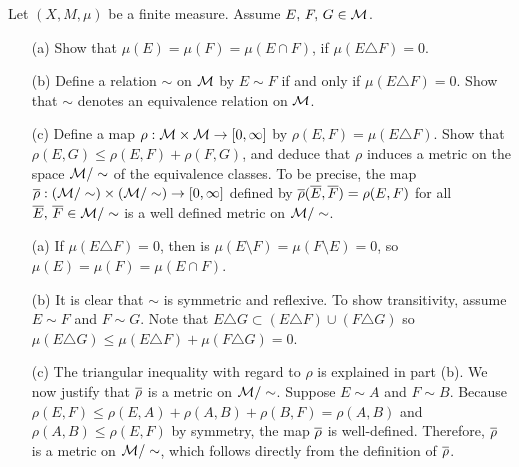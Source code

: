 \begin{prob}[Exercise 1.12]
    Let $(X, M, \mu)$ be a finite measure.
    Assume $E,\,F,\,G\in{\mathcal{M}}$.
    \begin{enumerate}
        \item[(a)]
        {
            Show that $\mu(E)=\mu(F)=\mu(E\cap F)$, if $\mu(E\triangle F)=0$.
        }
        \item[(b)]
        {
            Define a relation $\sim$ on ${\mathcal{M}}$ by $E\sim F$ if and only if $\mu(E\triangle F)=0$.
            Show that $\sim$ denotes an equivalence relation on ${\mathcal{M}}$.
        }
        \item[(c)]
        {
            Define a map $\rho: {\mathcal{M}}\times{\mathcal{M}}\rightarrow[0, \infty]$ by $\rho(E, F)=\mu(E\triangle F)$.
            Show that $\rho(E, G)\leq\rho(E, F)+\rho(F, G)$, and deduce that $\rho$ induces a metric on the space ${\mathcal{M}}/\sim$ of the equivalence classes.
            To be precise, the map $\overline{\rho}: ({\mathcal{M}}/\sim)\times({\mathcal{M}}/\sim)\rightarrow[0,\infty]$ defined by $\overline{\rho}(\overline{E}, \overline{F})=\rho(E, F)$ for all $\overline{E},\,\overline{F}\in{\mathcal{M}}/\sim$ is a well defined metric on ${\mathcal{M}}/\sim$.
        }
    \end{enumerate}
\end{prob}
\begin{sol}
    \begin{enumerate}
        \item[(a)]
        {
            If $\mu(E\triangle F)=0$, then is $\mu(E\setminus F)=\mu(F\setminus E)=0$, so $\mu(E)=\mu(F)=\mu(E\cap F)$.
        }
        \item[(b)]
        {
            It is clear that $\sim$ is symmetric and reflexive.
            To show transitivity, assume $E\sim F$ and $F\sim G$.
            Note that $E\triangle G\subset(E\triangle F)\cup(F\triangle G)$ so $\mu(E\triangle G)\leq\mu(E\triangle F)+\mu(F\triangle G)=0$.
        }
        \item[(c)]
        {
            The triangular inequality with regard to $\rho$ is explained in part (b).
            We now justify that $\overline{\rho}$ is a metric on ${\mathcal{M}}/\sim$.
            Suppose $E\sim A$ and $F\sim B$.
            Because $\rho(E, F)\leq\rho(E, A)+\rho(A, B)+\rho(B, F)=\rho(A, B)$ and $\rho(A, B)\leq\rho(E, F)$ by symmetry, the map $\overline{\rho}$ is well-defined.
            Therefore, $\overline{\rho}$ is a metric on ${\mathcal{M}}/\sim$, which follows directly from the definition of $\overline{\rho}$.
        }
    \end{enumerate}
\end{sol}

